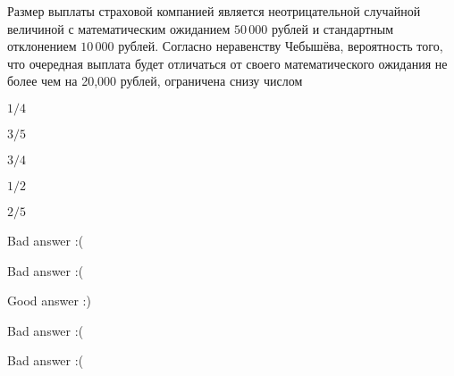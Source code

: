 
\begin{question}
Размер выплаты страховой компанией является неотрицательной случайной
величиной с математическим ожиданием \(50\,000\) рублей и стандартным
отклонением \(10\,000\) рублей. Согласно неравенству Чебышёва,
вероятность того, что очередная выплата будет отличаться от своего
математического ожидания не более чем на 20,000 рублей, ограничена снизу
числом
\begin{answerlist}
  \item \(1/4\)
  \item \(3/5\)
  \item \(3/4\)
  \item \(1/2\)
  \item \(2/5\)
\end{answerlist}
\end{question}

\begin{solution}
\begin{answerlist}
  \item Bad answer :(
  \item Bad answer :(
  \item Good answer :)
  \item Bad answer :(
  \item Bad answer :(
\end{answerlist}
\end{solution}

